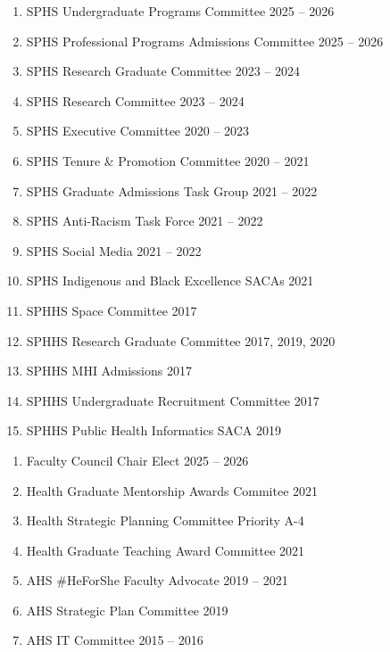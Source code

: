 \documentclass[12pt]{article}
\begin{document}
    \begin{enumerate}
    \setlength{\labelsep}{0em}
    \setlength{\itemsep}{-5pt}
        \item[] SPHS Undergraduate Programs Committee 2025 -- 2026
        \item[] SPHS Professional Programs Admissions Committee 2025 -- 2026
        \item[] SPHS Research Graduate Committee 2023 -- 2024
        \item[] SPHS Research Committee 2023 -- 2024
        \item[] SPHS Executive Committee 2020 -- 2023
        \item[] SPHS Tenure \& Promotion Committee 2020 -- 2021
        \item[] SPHS Graduate Admissions Task Group 2021 -- 2022
        \item[] SPHS Anti-Racism Task Force 2021 -- 2022
        \item[] SPHS Social Media 2021 -- 2022
        \item[] SPHS Indigenous and Black Excellence SACAs 2021
        \item[] SPHHS Space Committee 2017
        \item[] SPHHS Research Graduate Committee 2017, 2019, 2020 
        \item[] SPHHS MHI Admissions 2017
        \item[] SPHHS Undergraduate Recruitment Committee 2017
        \item[] SPHHS Public Health Informatics SACA 2019
    \end{enumerate}

    \begin{enumerate}
    \setlength{\labelsep}{0em}
    \setlength{\itemsep}{-5pt}
        \item[] Faculty Council Chair Elect 2025 -- 2026
        \item[] Health Graduate Mentorship Awards Commitee 2021
        \item[] Health Strategic Planning Committee Priority A-4
        \item[] Health Graduate Teaching Award Committee 2021
        \item[] AHS \#HeForShe Faculty Advocate 2019 -- 2021
        \item[] AHS Strategic Plan Committee 2019
        \item[] AHS IT Committee 2015 -- 2016
    \end{enumerate}
\end{document}
